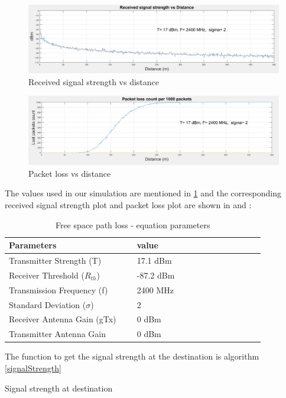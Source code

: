 \begin{figure}[hbtp]
\centering
\includegraphics[width=1\textwidth]{ncsuthesis-0.6/Chapter-4/figs/signal_strength}
\caption{Received signal strength vs distance}
\label{fig:signal_strength}
\end{figure}
\begin{figure}[hbtp]
\centering
\includegraphics[width=1\textwidth]{ncsuthesis-0.6/Chapter-4/figs/packet_loss}
\caption{Packet loss vs distance}
\label{fig:packet_loss}
\end{figure}
The values used in our simulation are mentioned in \ref{tab:fspl_parameters} and the corresponding received signal strength plot and packet loss plot are shown in  and :

\begin{table}
\caption{Free space path loss - equation parameters}
\label{tab:fspl_parameters}
\begin{tabular}{|p{0.43\linewidth}|p{0.43\linewidth}|}
\toprule
Parameters & value \cite{wilink}\\
\midrule
Transmitter Strength (T) & 17.1  dBm \\
\midrule
Receiver Threshold ($R_{th}$)	& -87.2 dBm  \\
\midrule
Transmission Frequency (f) & 2400 MHz \\
\midrule
Standard Deviation ($\sigma$) & 2\\
\midrule
Receiver Antenna Gain (gTx) & 0 dBm\\
\midrule
Transmitter Antenna Gain & 0 dBm \\
\bottomrule
\end{tabular}
\end{table}


The function to get the signal strength at the destination is algorithm \ref{signalStrength}
\begin{algorithm}
\caption{Signal strength at destination}
\label{signalStrength}
\DontPrintSemicolon
{}

\end{algorithm} 


